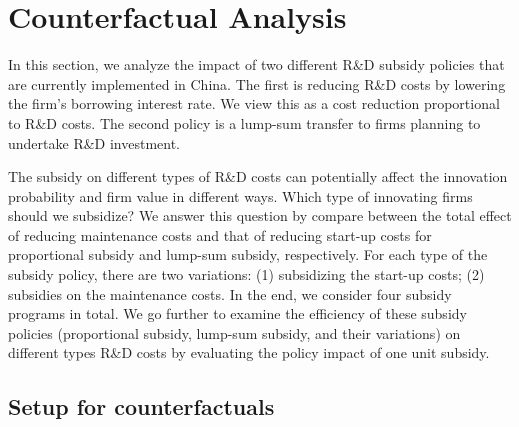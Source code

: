 \documentclass[11pt]{article}
\begin{document}
\section{Counterfactual Analysis}
In this section, we analyze the impact of two different R\&D subsidy policies that are currently implemented in China. The first is reducing R\&D costs by lowering the firm's borrowing interest rate. We view this as a cost reduction proportional to R\&D costs. The second policy is a lump-sum transfer to firms planning to undertake R\&D investment. 

The subsidy on different types of R\&D costs can potentially affect the innovation probability and firm value in different ways. Which type of innovating firms should we subsidize? We answer this question by compare between the total effect of reducing maintenance costs and that of reducing start-up costs for proportional subsidy and lump-sum subsidy, respectively. For each type of the subsidy policy, there are two variations: (1) subsidizing the start-up costs; (2) subsidies on the maintenance costs. In the end, we consider four subsidy programs in total. We go further to examine the efficiency of these subsidy policies (proportional subsidy, lump-sum subsidy, and their variations) on different types R\&D costs by evaluating the policy impact of one unit subsidy.  

\subsection{Setup for counterfactuals} 
\end{document}
